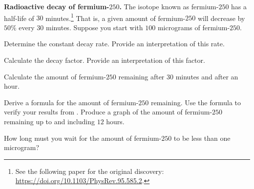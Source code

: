 \documentclass[a4paper,oneside,12pt]{article}
\begin{document}
\begin{exercise}
\textbf{Radioactive decay of fermium-$250$.}
The isotope known as fermium-$250$ has a half-life of $30$
minutes.\footnote{
  See the following paper for the original discovery:
  \url{https://doi.org/10.1103/PhysRev.95.585.2}.
}
That is, a given amount of fermium-$250$ will decrease by $50\%$ every
$30$ minutes.  Suppose you start with $100$ micrograms of
fermium-$250$.
\begin{packedenum}
\item\label{subex:fermium250_decay_rate}
  Determine the constant decay rate.  Provide an interpretation of
  this rate.

\item\label{subex:fermium250_decay_factor}
  Calculate the decay factor.  Provide an interpretation of this
  factor.

\item\label{subex:fermium250_30minutes_60minutes}
  Calculate the amount of fermium-$250$ remaining after $30$ minutes
  and after an hour.

\item\label{subex:fermium250_decay_formula}
  Derive a formula for the amount of fermium-$250$ remaining.  Use the
  formula to verify your results
  from .  Produce a graph
  of the amount of fermium-$250$ remaining up to and including $12$
  hours.

\item\label{subex:fermium250_less_than_1microgram}
  How long must you wait for the amount of fermium-$250$ to be less
  than one microgram?
\end{packedenum}
\end{exercise}
\end{document}
